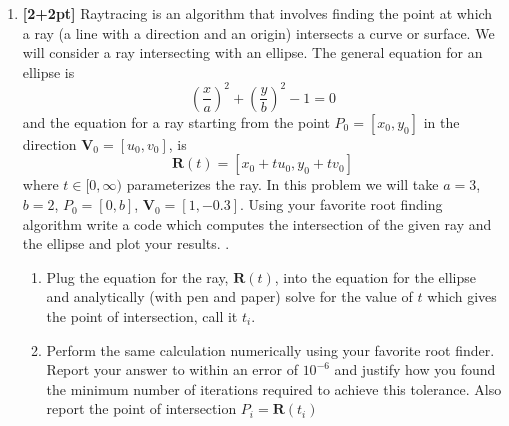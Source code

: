 \documentclass[11pt]{article}
\begin{document}
\begin{enumerate}

\item {\bf [2+2pt]} Raytracing is an algorithm that involves finding the
  point at which a ray (a line with a direction and an origin)
  intersects a curve or surface. We will consider a ray intersecting
  with an ellipse. The general equation for an ellipse is
\[
\left( \frac{x}{a} \right)^{2} + \left( \frac{y}{b} \right)^{2} - 1 = 0
\]
and the equation for a ray starting from the point $P_0 = [x_0,y_0]$
in the direction $\textbf{V}_0 = [u_0,v_0]$, is
\[
\textbf{R}(t) = [x_0 + t u_0,y_0 + t v_0]
\]
where $t \in [0,\infty)$ parameterizes the ray. In this problem we
  will take $a = 3$, $b=2$, $P_0 = [0,b]$, $\textbf{V}_0 =
  [1,-0.3]$. Using your favorite root finding algorithm write a code
  which computes the intersection of the given ray and the ellipse and
  plot your results. .
\begin{enumerate}
	\item Plug the equation for the ray, $\textbf{R}(t)$, into the
          equation for the ellipse and analytically (with pen and
          paper) solve for the value of $t$ which gives the point of
          intersection, call it $t_i$.
	\item Perform the same calculation numerically using your
          favorite root finder. Report your answer to within an error
          of $10^{-6}$ and justify how you found the minimum number of
          iterations required to achieve this tolerance. Also report
          the point of intersection $P_i = \textbf{R}(t_i)$
\end{enumerate} 


\end{enumerate}
\end{document}
